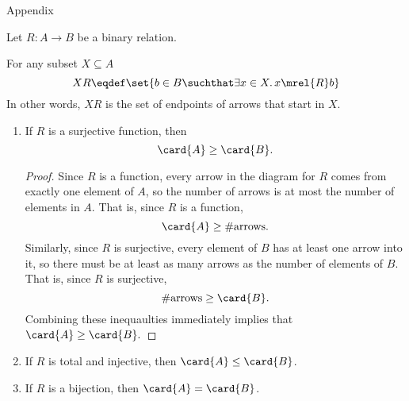 \documentclass[handout]{mcs}
\begin{document}








\begin{center}
{\Large Appendix}
\end{center}

Let $R: A \to B$ be a binary relation.

For any subset $X \subseteq A$
\[
XR \eqdef \set{b \in B \suchthat \exists x \in X.\, x\mrel{R}b}
\]
In other words, $XR$ is the set of endpoints of arrows that start in $X$.

\begin{lemma} \mbox{}

\begin{enumerate}

\item If $R$ is a surjective function, then
\[
\card{A} \geq \card{B}.
\]

\begin{proof}
  Since $R$ is a function, every arrow in the diagram for $R$ comes from
  exactly one element of $A$, so the number of arrows is at most the
  number of elements in $A$.  That is, since $R$ is a function,
\[
\card{A} \geq \#\text{arrows}.
\]
Similarly, since $R$ is surjective, every element of $B$ has at least one
arrow into it, so there must be at least as many arrows as the number of
elements of $B$.  That is, since $R$ is surjective,
\[
\#\text{arrows} \geq \card{B}.
\]
Combining these inequaulties immediately implies that $\card{A} \geq \card{B}.$

\end{proof}

\item If $R$ is total and injective, then $\card{A} \leq \card{B}$.

\item If $R$ is a bijection, then $\card{A} = \card{B}$.

\end{enumerate}

\end{lemma}
\end{document}
